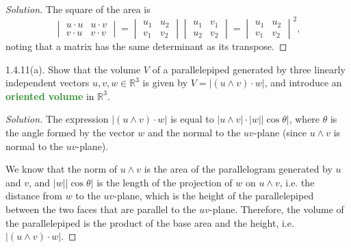 \documentclass[11pt]{scrartcl}
\providecommand{\RR}{\mathbb R}
\newenvironment{soln}{\begin{proof}[Solution]}{\end{proof}}
\providecommand{\vocab}[1]{{\textbf{\textcolor{ForestGreen}{#1}}}}
\begin{document}
\begin{soln}
	The square of the area is
	\[\begin{vmatrix}
		u\cdot u & u\cdot v\\
		v\cdot u & v\cdot v
	\end{vmatrix} = \begin{vmatrix}
		u_1&u_2\\v_1&v_2
	\end{vmatrix}
	\begin{vmatrix}
	u_1&v_1\\u_2&v_2
	\end{vmatrix}
	= \begin{vmatrix}
		u_1&u_2\\v_1&v_2
	\end{vmatrix}^2,\]
	noting that a matrix has the same determinant as its transpose.
\end{soln}

\begin{problem*}1.4.11(a).
	Show that the volume $V$ of a parallelepiped generated by
	three linearly independent vectors $u,v,w\in\RR^3$ is given by
	$V = |(u\wedge v)\cdot w|$, and introduce an
	\vocab{oriented volume} in $\RR^3$.
\end{problem*}

\begin{soln}
	The expression $|(u\wedge v)\cdot w|$ is equal to
	$|u\wedge v|\cdot|w||\cos\theta|$, where $\theta$ is the angle formed by
	the vector $w$ and the normal to the $uv$-plane
	(since $u\wedge v$ is normal to the $uv$-plane).
	
	We know that the norm of $u\wedge v$ is the area of
	the parallelogram generated by $u$ and $v$, and $|w||\cos\theta|$
	is the length of the projection of $w$ on $u\wedge v$,
	i.e. the distance from $w$ to the $uv$-plane, which is
	the height of the parallelepiped between the two faces
	that are parallel to the $uv$-plane.
	Therefore, the volume of the parallelepiped is
	the product of the base area and the height, i.e. $|(u\wedge v)\cdot w|$.
\end{soln}
\end{document}
